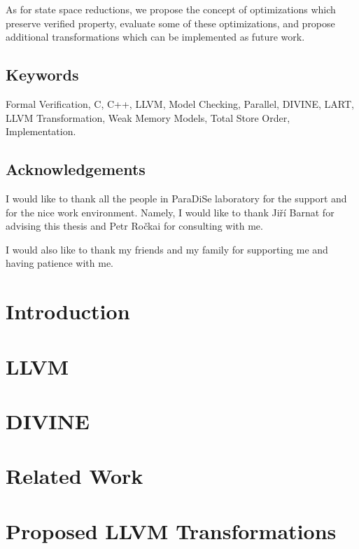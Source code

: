 \documentclass[11pt,twoside,a4paper]{book}
\newcommand{\divine}{\mbox{\textsf{DIVINE}}\xspace}
\newcommand{\lart}{\mbox{\textsf{LART}}\xspace}
\newcommand{\paradise}{ParaDiSe\xspace}
\newcommand{\llvm}{\textsf{LLVM}\xspace}
\begin{document}
As for state space reductions, we propose the concept of optimizations which
preserve verified property, evaluate some of these optimizations, and propose
additional transformations which can be implemented as future work.

\section*{Keywords}
Formal Verification, C, C++, \llvm, Model Checking, Parallel,
\divine, \lart, \llvm Transformation, Weak Memory Models, Total Store Order,
Implementation.

\cleardoublepage

\section*{Acknowledgements}
I would like to thank all the people in \paradise laboratory for the support and
for the nice work environment. Namely, I would like to thank Jiří Barnat for
advising this thesis and Petr Ročkai for consulting with me.

I would also like to thank my friends and my family for supporting me and having
patience with me.

\cleardoublepage
\thispagestyle{empty}

\pagestyle{headings}
\tableofcontents %
\mainmatter


\chapter{Introduction}\label{chap:introduction}


\chapter{\llvm} \label{chap:llvm}


\chapter{\divine} \label{chap:divine}


\chapter{Related Work} \label{chap:related}


\chapter{Proposed \llvm Transformations} \label{chap:trans}

\end{document}

